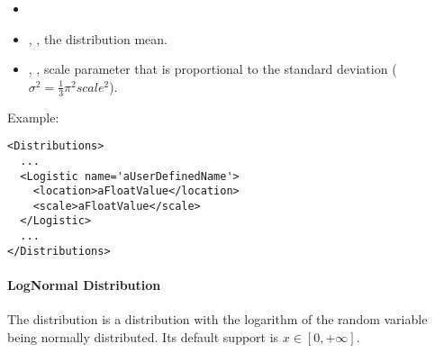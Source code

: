 %
\attrIntro
\vspace{-5mm}
\begin{itemize}
  \itemsep0em
  \item \nameDescription
\end{itemize}
\vspace{-5mm}
\subnodesIntro
\begin{itemize}
  \item {}, , the
  distribution
  mean.
  \item {}, , scale parameter
  that
  is proportional to the standard deviation ($\sigma ^{2}=\frac{1}{3}\pi^{2}scale^{2} $).
\end{itemize}

Example:
\begin{lstlisting}[style=XML]
<Distributions>
  ...
  <Logistic name='aUserDefinedName'>
    <location>aFloatValue</location>
    <scale>aFloatValue</scale>
  </Logistic>
  ...
</Distributions>
\end{lstlisting}

\paragraph{LogNormal Distribution}
\label{LogNormal}
The  distribution is a distribution with the
logarithm of the random variable being normally distributed.
%
Its default support is $x \in [0, +\infty]$.

